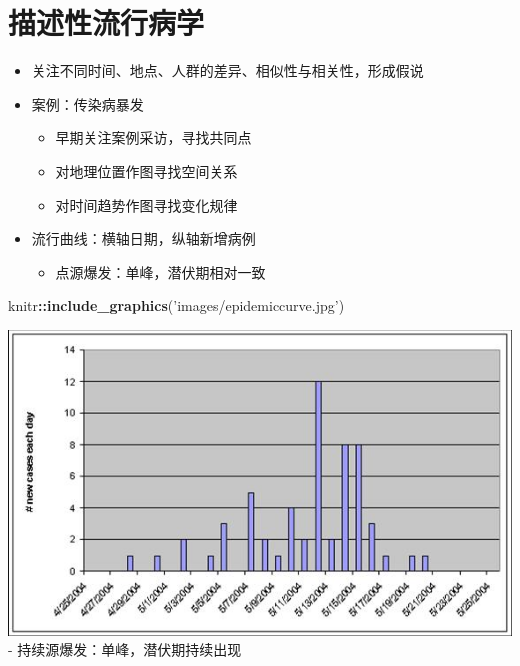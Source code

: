 \documentclass[
]{book}
\newenvironment{Shaded}{\begin{snugshade}}{\end{snugshade}}
\newcommand{\KeywordTok}[1]{\textcolor[rgb]{0.13,0.29,0.53}{\textbf{#1}}}
\newcommand{\NormalTok}[1]{#1}
\newcommand{\OperatorTok}[1]{\textcolor[rgb]{0.81,0.36,0.00}{\textbf{#1}}}
\newcommand{\StringTok}[1]{\textcolor[rgb]{0.31,0.60,0.02}{#1}}
\providecommand{\tightlist}{%
  \setlength{\itemsep}{0pt}\setlength{\parskip}{0pt}}
\begin{document}
\hypertarget{ux63cfux8ff0ux6027ux6d41ux884cux75c5ux5b66}{%
\section{描述性流行病学}\label{ux63cfux8ff0ux6027ux6d41ux884cux75c5ux5b66}}

\begin{itemize}
\tightlist
\item
  关注不同时间、地点、人群的差异、相似性与相关性，形成假说
\item
  案例：传染病暴发

  \begin{itemize}
  \tightlist
  \item
    早期关注案例采访，寻找共同点
  \item
    对地理位置作图寻找空间关系
  \item
    对时间趋势作图寻找变化规律
  \end{itemize}
\item
  流行曲线：横轴日期，纵轴新增病例

  \begin{itemize}
  \tightlist
  \item
    点源爆发：单峰，潜伏期相对一致
  \end{itemize}
\end{itemize}

\begin{Shaded}
\begin{Highlighting}[]
\NormalTok{knitr}\OperatorTok{::}\KeywordTok{include_graphics}\NormalTok{(}\StringTok{'images/epidemiccurve.jpg'}\NormalTok{)}
\end{Highlighting}
\end{Shaded}

\includegraphics[width=7.94in]{images/epidemiccurve}
- 持续源爆发：单峰，潜伏期持续出现
\end{document}
